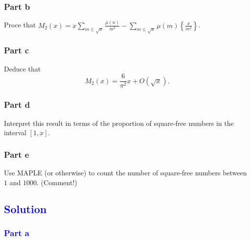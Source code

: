 \documentclass{unswmaths}
\begin{document}
\subsubsection*{Part b}
Proce that $ M_2(x) = x \sum_{m \leq \sqrt{x}} \frac{\mu(n)}{m^2} - \sum_{m \leq \sqrt{x}} \mu(m) \left\{ \frac{x}{m^2} \right\} $.

\subsubsection*{Part c}
Deduce that 
$$
	M_2(x) = \frac{6}{\pi^2}x + O(\sqrt{x}).
$$

\subsubsection*{Part d}
Interpret this result in terms of the proportion of square-free numbers
in the interval $[ 1, x] $.
\subsubsection*{Part e}
Use MAPLE (or otherwise) to count the number of square-free numbers between $ 1 $ and $ 1000 $. (Comment!)

\hrulefill

\subsection*{\textcolor{blue}{Solution}}

\subsubsection*{\textcolor{blue}{Part a}}
\end{document}
